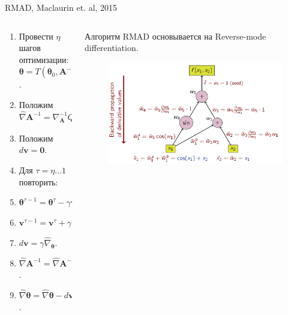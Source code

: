 \documentclass[usenames,dvipsnames,10pt,pdf,utf8,russian,aspectratio=43]{beamer}
\begin{document}
\begin{frame}{RMAD, Maclaurin et. al, 2015 }
\begin{columns}
\begin{column}{0.5\textwidth}
\begin{enumerate}
\item Провести $\eta$ шагов оптимизации: $\boldsymbol{\theta} = T(\boldsymbol{\theta}_0, \mathbf{A}^{-1})$.
\item Положим $\hat{\nabla} \mathbf{A}^{-1} = \nabla_\mathbf{A}^{-1} Q(\boldsymbol{\theta}, \mathbf{A}^{-1}).$ 
\item Положим $d\mathbf{v} = \mathbf{0}.$
\item Для $\tau = \eta \dots 1 $ повторить:
\item $\boldsymbol{\theta}^{\tau-1} =  \boldsymbol{\theta}^{\tau} - \gamma\mathbf{v}^{\tau}.$
\item $\mathbf{v}^{\tau-1} =\mathbf{v}^{\tau} + \gamma \hat{\nabla}_{\boldsymbol{\theta}}.$
\item $d\mathbf{v} =  \gamma \hat{\nabla}_{\boldsymbol{\theta}}$.
\item $\hat{\nabla} \mathbf{A}^{-1} =  \hat{\nabla} \mathbf{A}^{-1} - d\mathbf{v}\nabla_{\mathbf{A}^{-1}} \nabla_{\boldsymbol{\theta}} Q$.
\item $\hat{\nabla} \boldsymbol{\theta}  = \hat{\nabla} \boldsymbol{\theta}  - d\mathbf{v}\nabla_{\boldsymbol{\theta}} \nabla_{\boldsymbol{\theta}} Q$.
\end{enumerate}
\end{column}

\begin{column}{0.5\textwidth}
Алгоритм RMAD основывается на Reverse-mode differentiation.
\begin{figure}
\includegraphics[width=\textwidth]{rmd.png}
\end{figure}
\end{column}
\end{columns}
\end{frame}
\end{document}
